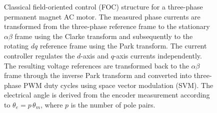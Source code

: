 \begin{figure}[htbp]
{%
}
\caption{Classical field-oriented control (FOC) structure for a three-phase
permanent magnet AC motor. The measured phase currents are transformed from the
three-phase reference frame to the stationary $\alpha\beta$ frame using the
Clarke transform and subsequently to the rotating $dq$ reference frame using the
Park transform. The current controller regulates the $d$-axis and $q$-axis currents
independently. The resulting voltage references are transformed back to the
$\alpha\beta$ frame through the inverse Park transform and converted into
three-phase PWM duty cycles using space vector modulation (SVM). The electrical
angle is derived from the encoder measurement according to $\theta_e=p\,\theta_m$,
where $p$ is the number of pole pairs.}
\label{fig:foc-complete-loop}
\end{figure}
